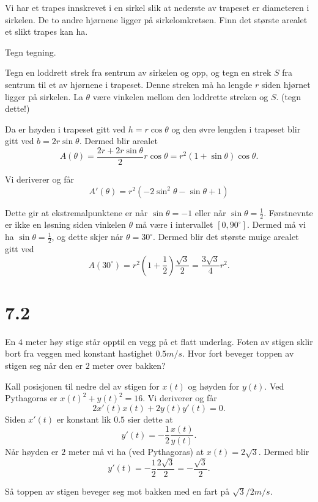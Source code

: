 \documentclass[11pt, norsk]{article}
\begin{document}
\begin{oppg}[7.15]
Vi har et trapes innskrevet i en sirkel slik at nederste av trapeset er diameteren i sirkelen. De to andre hjørnene ligger på sirkelomkretsen. Finn det største arealet et slikt trapes kan ha.
\end{oppg}
\begin{losn}
Tegn tegning.

Tegn en loddrett strek fra sentrum av sirkelen og opp, og tegn en strek $S$ fra sentrum til et av hjørnene i trapeset. Denne streken må ha lengde $r$ siden hjørnet ligger på sirkelen. La $\theta$ være vinkelen mellom den loddrette streken og $S$. (tegn dette!)

Da er høyden i trapeset gitt ved $h=r \cos \theta$ og den øvre lengden i trapeset blir gitt ved $b=2r \sin \theta$. Dermed blir arealet
$$
A(\theta) = \frac{2r+2r\sin \theta}{2} r \cos \theta = r^2(1+ \sin \theta) \cos \theta.
$$

Vi deriverer og får
$$
A'(\theta) = r^2(-2\sin^2 \theta - \sin \theta + 1)
$$

Dette gir at ekstremalpunktene er når $\sin \theta = -1$ eller når $\sin \theta = \frac 12$. Førstnevnte er ikke en løsning siden vinkelen $\theta$ må være i intervallet $[0,90^\circ]$. Dermed må vi ha $\sin \theta = \frac 12$, og dette skjer når $\theta = 30^\circ$. Dermed blir det største muige arealet gitt ved 
$$
A(30^\circ) = r^2(1+\frac 12) \frac{\sqrt 3}{2} = \frac{3 \sqrt 3}{4} r^2.
$$
\end{losn}


\section{7.2}

\begin{oppg}
En $4$ meter høy stige står opptil en vegg på et flatt underlag. Foten av stigen sklir bort fra veggen med konstant hastighet $0.5 m/s$. Hvor fort beveger toppen av stigen seg når den er $2$ meter over bakken?
\end{oppg}

\begin{losn}
Kall posisjonen til nedre del av stigen for $x(t)$ og høyden for $y(t)$. Ved Pythagoras er $x(t)^2+y(t)^2=16$. Vi deriverer og får
$$
2x'(t)x(t) +2y(t)y'(t)=0.
$$
Siden $x'(t)$ er konstant lik $0.5$ sier dette at 
$$
y'(t) = -\frac 12 \frac{x(t)}{y(t)}.
$$
Når høyden er $2$ meter må vi ha (ved Pythagoras) at $x(t) = 2 \sqrt{3}$. Dermed blir
$$
y'(t) = -\frac 12 \frac{2 \sqrt{3}}{2}= - \frac{\sqrt{3}}{2}.
$$

Så toppen av stigen beveger seg mot bakken med en fart på $\sqrt 3 / 2 m/s$. 
\end{losn}
\end{document}
